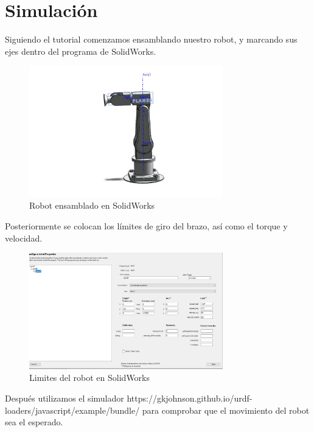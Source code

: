 \section{Simulación} \label{sec:simulacion}

Siguiendo el tutorial comenzamos ensamblando nuestro robot, y marcando sus ejes dentro del programa de SolidWorks.

\begin{figure}[h]
	\centering
	\includegraphics[width=0.75\textwidth]{img/ROBOT SOLID}
	\caption{Robot ensamblado en SolidWorks}
	\label{fig:ROBOT SOLID}
\end{figure}

Posteriormente se colocan los límites de giro del brazo, así como el torque y velocidad.


\begin{figure}[H]
	\centering
	\includegraphics[width=0.75\textwidth]{img/limitessolidrobot}
	\caption{Limites del robot en SolidWorks}
	\label{fig:Limites del robot en SolidWorks}
\end{figure}
  
  
\newpage

Después utilizamos el simulador https://gkjohnson.github.io/urdf-loaders/javascript/example/bundle/   para comprobar que el movimiento del robot sea el esperado.


